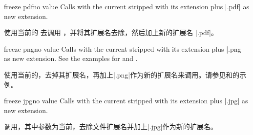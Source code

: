 \begin{docTcbKey}[][doc new=2016-07-14]{freeze pdf}{}{no value}
Calls  with the current 
stripped with its extension plus |.pdf| as new extension.

使用当前的  去调用 ，并将其扩展名去除，然后加上新的扩展名 |.pdf|。
\end{docTcbKey}

\begin{docTcbKey}[][doc new=2016-07-14]{freeze png}{}{no value}
Calls  with the current 
stripped with its extension plus |.png| as new extension.
See the examples for  and .

使用当前的，去掉其扩展名，再加上|.png|作为新的扩展名来调用。请参见和的示例。
\end{docTcbKey}

\begin{docTcbKey}[][doc new=2016-07-14]{freeze jpg}{}{no value}
Calls  with the current 
stripped with its extension plus |.jpg| as new extension.

调用，其中参数为当前，去除文件扩展名并加上|.jpg|作为新的扩展名。
\end{docTcbKey}